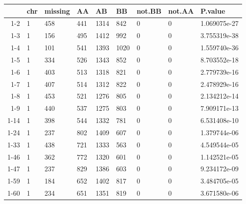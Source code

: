 \documentclass[11pt]{article}
\begin{document}
    \begin{tabular}{r|llllllll}
  & chr & missing & AA & AB & BB & not.BB & not.AA & P.value\\
\hline
	1-2 & 1            &  458         &  441         & 1314         &  842         & 0            & 0            & 1.069075e-27\\
	1-3 & 1            &  156         &  495         & 1412         &  992         & 0            & 0            & 3.755319e-38\\
	1-4 & 1            &  101         &  541         & 1393         & 1020         & 0            & 0            & 1.559740e-36\\
	1-5 & 1            &  334         &  526         & 1343         &  852         & 0            & 0            & 8.703552e-18\\
	1-6 & 1            &  403         &  513         & 1318         &  821         & 0            & 0            & 2.779739e-16\\
	1-7 & 1            &  407         &  514         & 1312         &  822         & 0            & 0            & 2.478929e-16\\
	1-8 & 1            &  453         &  521         & 1276         &  805         & 0            & 0            & 2.134212e-14\\
	1-9 & 1            &  440         &  537         & 1275         &  803         & 0            & 0            & 7.909171e-13\\
	1-14 & 1            &  398         &  544         & 1332         &  781         & 0            & 0            & 6.531408e-10\\
	1-24 & 1            &  237         &  802         & 1409         &  607         & 0            & 0            & 1.379744e-06\\
	1-33 & 1            &  438         &  721         & 1333         &  563         & 0            & 0            & 4.549544e-05\\
	1-46 & 1            &  362         &  772         & 1320         &  601         & 0            & 0            & 1.142521e-05\\
	1-47 & 1            &  237         &  829         & 1386         &  603         & 0            & 0            & 9.234172e-09\\
	1-59 & 1            &  184         &  652         & 1402         &  817         & 0            & 0            & 3.484705e-05\\
	1-60 & 1            &  234         &  651         & 1351         &  819         & 0            & 0            & 3.671580e-06\\

\end{tabular}
\end{document}
